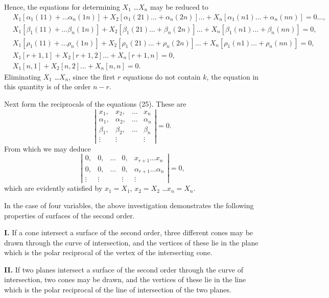 \documentclass[11pt,a4paper]{book}
\begin{document}
Hence, the equations for determining $X_1$ \ldots $X_n$ may be reduced to
\begin{align*}
&X_1[\alpha_1(11) + \ldots \alpha_n(1n)] + X_2[\alpha_1(21) \ldots + \alpha_n(2n)] \ldots + X_n[\alpha_1(n1) \ldots + \alpha_n(nn)] = 0 \ldots \tag{30},\\
&X_1[\beta_1(11) + \ldots \beta_n(1n)] + X_2[\beta_1(21) \ldots + \beta_n(2n)] \ldots + X_n[\beta_1(n1) \ldots + \beta_n(nn)] = 0, \\
&X_1[\rho_1(11) + \ldots \rho_n(1n)] + X_2[\rho_1(21) \ldots + \rho_n(2n)] \ldots + X_n[\rho_1(n1) \ldots + \rho_n(nn)] = 0, \\
&X_1[r+1, 1] + X_2[r+1, 2] \ldots + X_n[r+1, n] = 0, \\
&X_1[n, 1] + X_2[n, 2] \ldots + X_n[n, n] = 0.
\end{align*}
Eliminating $X_1$ \ldots $X_n$, since the first $r$ equations do not contain $k$, the equation in
this quantity is of the order $n-r$.

Next form the reciprocals of the equations (25). These are
\[
\left|\begin{array}{cccc}
x_1, & x_2, & \ldots & x_n \\
\alpha_1, & \alpha_2, & \ldots & \alpha_n \\
\beta_1, & \beta_2, & \ldots & \beta_n \\
\vdots & \vdots & & \vdots
\end{array}\right| = 0
\tag{31}.
\]
From which we may deduce
\[
\left|\begin{array}{cccccc}
0, & 0, & \ldots & 0, & x_{r+1} \ldots x_n \\
0, & 0, & \ldots & 0, & \alpha_{r+1} \ldots \alpha_n \\
\vdots & \vdots & & \vdots & \vdots
\end{array}\right| = 0 \tag{32},
\]
which are evidently satisfied by $x_1 = X_1$, $x_2 = X_2$ \ldots $x_n = X_n$.

In the case of four variables, the above investigation demonstrates the following
properties of surfaces of the second order.

\textbf{I.} If a cone intersect a surface of the second order, three different cones may
be drawn through the curve of intersection, and the vertices of these lie in the plane
which is the polar reciprocal of the vertex of the intersecting cone.

\textbf{II.} If two planes intersect a surface of the second order through the curve of
intersection, two cones may be drawn, and the vertices of these lie in the line which
is the polar reciprocal of the line of intersection of the two planes.
\end{document}
